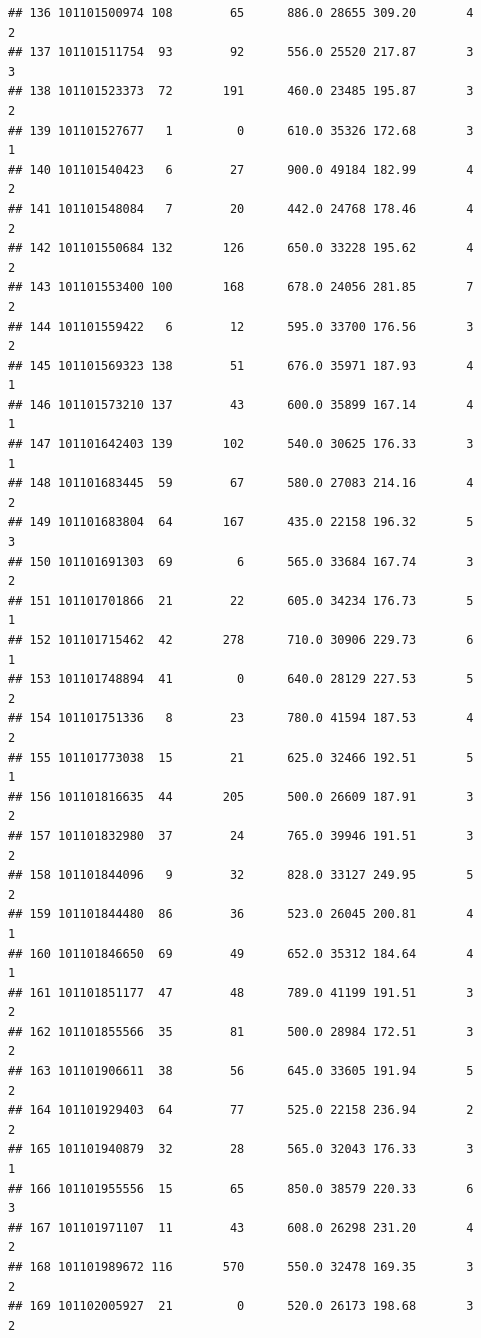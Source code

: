 \documentclass[
]{article}
\begin{document}
\begin{verbatim}
## 136 101101500974 108        65      886.0 28655 309.20       4          2
## 137 101101511754  93        92      556.0 25520 217.87       3          3
## 138 101101523373  72       191      460.0 23485 195.87       3          2
## 139 101101527677   1         0      610.0 35326 172.68       3          1
## 140 101101540423   6        27      900.0 49184 182.99       4          2
## 141 101101548084   7        20      442.0 24768 178.46       4          2
## 142 101101550684 132       126      650.0 33228 195.62       4          2
## 143 101101553400 100       168      678.0 24056 281.85       7          2
## 144 101101559422   6        12      595.0 33700 176.56       3          2
## 145 101101569323 138        51      676.0 35971 187.93       4          1
## 146 101101573210 137        43      600.0 35899 167.14       4          1
## 147 101101642403 139       102      540.0 30625 176.33       3          1
## 148 101101683445  59        67      580.0 27083 214.16       4          2
## 149 101101683804  64       167      435.0 22158 196.32       5          3
## 150 101101691303  69         6      565.0 33684 167.74       3          2
## 151 101101701866  21        22      605.0 34234 176.73       5          1
## 152 101101715462  42       278      710.0 30906 229.73       6          1
## 153 101101748894  41         0      640.0 28129 227.53       5          2
## 154 101101751336   8        23      780.0 41594 187.53       4          2
## 155 101101773038  15        21      625.0 32466 192.51       5          1
## 156 101101816635  44       205      500.0 26609 187.91       3          2
## 157 101101832980  37        24      765.0 39946 191.51       3          2
## 158 101101844096   9        32      828.0 33127 249.95       5          2
## 159 101101844480  86        36      523.0 26045 200.81       4          1
## 160 101101846650  69        49      652.0 35312 184.64       4          1
## 161 101101851177  47        48      789.0 41199 191.51       3          2
## 162 101101855566  35        81      500.0 28984 172.51       3          2
## 163 101101906611  38        56      645.0 33605 191.94       5          2
## 164 101101929403  64        77      525.0 22158 236.94       2          2
## 165 101101940879  32        28      565.0 32043 176.33       3          1
## 166 101101955556  15        65      850.0 38579 220.33       6          3
## 167 101101971107  11        43      608.0 26298 231.20       4          2
## 168 101101989672 116       570      550.0 32478 169.35       3          2
## 169 101102005927  21         0      520.0 26173 198.68       3          2

\end{verbatim}
\end{document}

